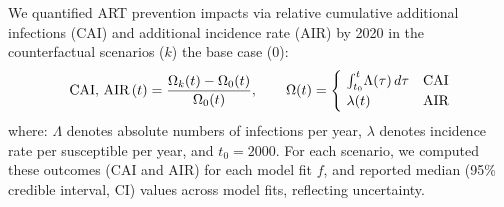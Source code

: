 \par
We quantified ART prevention impacts via relative
cumulative additional infections (CAI) and additional incidence rate (AIR) by 2020
in the counterfactual scenarios ($k$) \vs the base case ($0$):
\begin{equation}\label{eq:art.api}
  \textnormal{CAI, AIR}\,(t) = \frac{\Omega_{k}(t) - \Omega_{0}(t)}{\Omega_{0}(t)}
  ,\qquad \Omega(t) =
  \begin{cases}
    ~\int_{t_0}^{t}\!\Lambda(\tau)\,d\tau & \textnormal{CAI} \\
    ~\lambda(t) & \textnormal{AIR}
  \end{cases}
\end{equation} where:
$\Lambda$ denotes absolute numbers of infections per year,
$\lambda$ denotes incidence rate per susceptible per year,
and $t_0 = 2000$.
For each scenario, we computed these outcomes (CAI and AIR) for each model fit $f$,
and reported median (95\% credible interval, CI) values across model fits, reflecting uncertainty.
